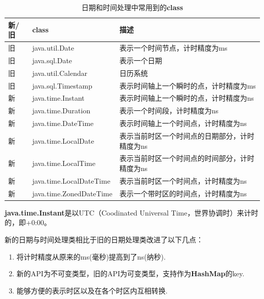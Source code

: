 \documentclass[cn,10pt,math=newtx,citestyle=gb7714-2015,bibstyle=gb7714-2015]{elegantbook}
\begin{document}
    \begin{table}[htbp]
        \centering
        \caption{日期和时间处理中常用到的\textbf{class}}
        \begin{tabular}{p{}p{}p{}}
            \toprule
                新/旧 & class & 描述 \\
            \midrule    
               旧 & java.util.Date & 表示一个时间节点，计时精度为ms \\
               旧 & java.sql.Date & 表示一个日期 \\
               旧 & java.util.Calendar & 日历系统 \\
               旧 & java.sql.Timestamp & 表示时间轴上一个瞬时的点，计时精度为ms \\
               新 & java.time.Instant & 表示时间轴上一个瞬时的点，计时精度为ns \\
               新 & java.time.Duration & 表示一个时间段，计时精度为ns \\
               新 & java.time.DateTime & 表示时间轴上一个时间点，计时精度为ns \\
               新 & java.time.LocalDate & 表示当前时区一个时间点的日期部分，计时精度为ns \\
               新 & java.time.LocalTime & 表示当前时区一个时间点的时间部分，计时精度为ns \\
               新 & java.time.LocalDateTime & 表示当前时区一个时间点，计时精度为ns \\
               新 & java.time.ZonedDateTime & 表示一个带时区的时间点，计时精度为ns \\
            \bottomrule
        \end{tabular}
    \end{table}

    \begin{note}
        \textbf{java.time.Instant}是以UTC（Coodinated Universal Time，世界协调时）来计时的，即+0:00。
    \end{note}

    新的日期与时间处理类相比于旧的日期处理类改进了以下几点：

    \begin{enumerate}
        \item 将计时精度从原来的ms(毫秒)提高到了ns(纳秒).
        \item 新的API为不可变类型，旧的API为可变类型，支持作为\textbf{HashMap}的key.
        \item 能够方便的表示时区以及在各个时区内互相转换.
    \end{enumerate}
\end{document}
